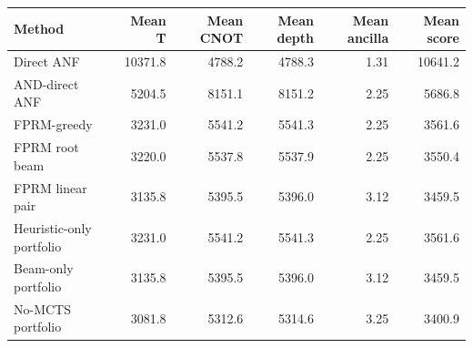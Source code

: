 \begin{tabular}{lrrrrr}
\toprule
Method & Mean T & Mean CNOT & Mean depth & Mean ancilla & Mean score \\
\midrule
Direct ANF & 10371.8 & 4788.2 & 4788.3 & 1.31 & 10641.2 \\
AND-direct ANF & 5204.5 & 8151.1 & 8151.2 & 2.25 & 5686.8 \\
FPRM-greedy & 3231.0 & 5541.2 & 5541.3 & 2.25 & 3561.6 \\
FPRM root beam & 3220.0 & 5537.8 & 5537.9 & 2.25 & 3550.4 \\
FPRM linear pair & 3135.8 & 5395.5 & 5396.0 & 3.12 & 3459.5 \\
Heuristic-only portfolio & 3231.0 & 5541.2 & 5541.3 & 2.25 & 3561.6 \\
Beam-only portfolio & 3135.8 & 5395.5 & 5396.0 & 3.12 & 3459.5 \\
No-MCTS portfolio & 3081.8 & 5312.6 & 5314.6 & 3.25 & 3400.9 \\
\bottomrule
\end{tabular}
